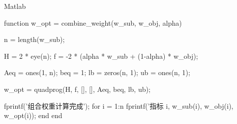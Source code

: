 \documentclass[12pt]{article}
\begin{document}
\begin{mycode}{Matlab}

function w_opt = combine_weight(w_sub, w_obj, alpha)
    
    n = length(w_sub);
    
    H = 2 * eye(n);
    f = -2 * (alpha * w_sub + (1-alpha) * w_obj);
    
    Aeq = ones(1, n);
    beq = 1;
    lb = zeros(n, 1);
    ub = ones(n, 1);
    
    w_opt = quadprog(H, f, [], [], Aeq, beq, lb, ub);
    
    fprintf('组合权重计算完成\n');
    for i = 1:n
        fprintf('指标 %
                i, w_sub(i), w_obj(i), w_opt(i));
    end
end
\end{mycode}
\end{document}
